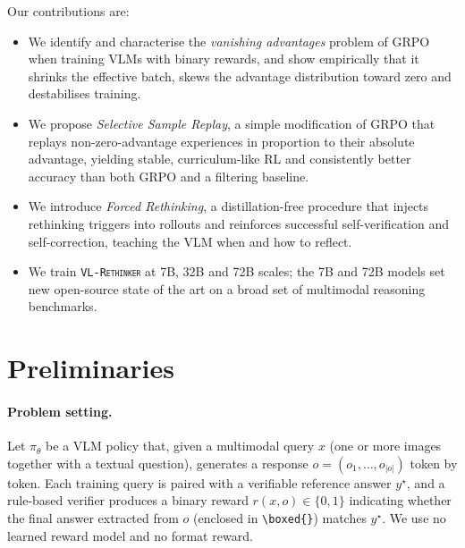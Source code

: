 \documentclass{article}
\newcommand{\model}{\texttt{\textsc{VL-Rethinker}}\xspace}
\begin{document}
Our contributions are:
\begin{itemize}[leftmargin=*,itemsep=1pt,topsep=2pt]
\item We identify and characterise the \emph{vanishing advantages} problem of GRPO when training VLMs with binary rewards, and show empirically that it shrinks the effective batch, skews the advantage distribution toward zero and destabilises training.
\item We propose \emph{Selective Sample Replay}, a simple modification of GRPO that replays non-zero-advantage experiences in proportion to their absolute advantage, yielding stable, curriculum-like RL and consistently better accuracy than both GRPO and a filtering baseline.
\item We introduce \emph{Forced Rethinking}, a distillation-free procedure that injects rethinking triggers into rollouts and reinforces successful self-verification and self-correction, teaching the VLM when and how to reflect.
\item We train \model at 7B, 32B and 72B scales; the 7B and 72B models set new open-source state of the art on a broad set of multimodal reasoning benchmarks.
\end{itemize}

\section{Preliminaries}
\label{sec:prelim}

\paragraph{Problem setting.} Let $\pi_\theta$ be a VLM policy that, given a multimodal query $x$ (one or more images together with a textual question), generates a response $o=(o_1,\dots,o_{|o|})$ token by token. Each training query is paired with a verifiable reference answer $y^\star$, and a rule-based verifier produces a binary reward $r(x,o)\in\{0,1\}$ indicating whether the final answer extracted from $o$ (enclosed in \texttt{\textbackslash boxed\{\}}) matches $y^\star$. We use no learned reward model and no format reward.
\end{document}
